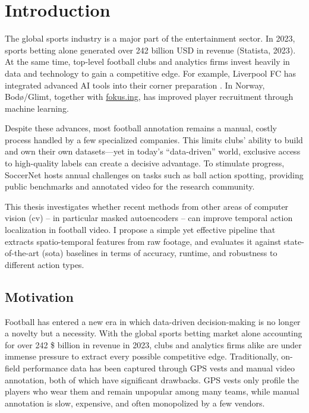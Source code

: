 \chapter{Introduction}
\label{chap:intro}

The global sports industry is a major part of the entertainment sector. In 2023, sports betting alone generated over 242 billion USD in revenue (Statista, 2023). At the same time, top-level football clubs and analytics firms invest heavily in data and technology to gain a competitive edge. For example, Liverpool FC has integrated advanced AI tools into their corner preparation \cite{wang_tactic_ai_2024}. In Norway, Bodø/Glimt, together with \hyperlink{https://fokus.ing}{fokus.ing}, has improved player recruitment through machine learning.

Despite these advances, most football annotation remains a manual, costly process handled by a few specialized companies. This limits clubs' ability to build and own their own datasets—yet in today's “data-driven” world, exclusive access to high-quality labels can create a decisive advantage. To stimulate progress, SoccerNet hosts annual challenges on tasks such as ball action spotting, providing public benchmarks and annotated video for the research community.

This thesis investigates whether recent methods from other areas of computer vision (\acrlong{cv}) – in particular masked autoencoders – can improve temporal action localization in football video. I propose a simple yet effective pipeline that extracts spatio-temporal features from raw footage, and evaluates it against state-of-the-art (\acrfull{sota}) baselines in terms of accuracy, runtime, and robustness to different action types.

\section{Motivation}
Football has entered a new era in which data-driven decision-making is no longer a novelty but a necessity. With the global sports betting market alone accounting for over 242 \$ billion in revenue in 2023, clubs and analytics firms alike are under immense pressure to extract every possible competitive edge. Traditionally, on-field performance data has been captured through GPS vests and manual video annotation, both of which have significant drawbacks. GPS vests only profile the players who wear them and remain unpopular among many teams, while manual annotation is slow, expensive, and often monopolized by a few vendors.  

